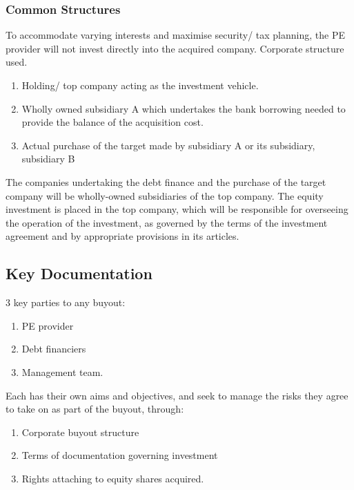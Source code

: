 \documentclass[
]{article}
\providecommand{\tightlist}{%
  \setlength{\itemsep}{0pt}\setlength{\parskip}{0pt}}
\begin{document}
\hypertarget{common-structures}{%
\subsubsection{Common Structures}\label{common-structures}}

To accommodate varying interests and maximise security/ tax planning,
the PE provider will not invest directly into the acquired company.
Corporate structure used.

\begin{enumerate}
\def\labelenumi{\arabic{enumi}.}
\tightlist
\item
  Holding/ top company acting as the investment vehicle.
\item
  Wholly owned subsidiary A which undertakes the bank borrowing needed
  to provide the balance of the acquisition cost.
\item
  Actual purchase of the target made by subsidiary A or its subsidiary,
  subsidiary B
\end{enumerate}

The companies undertaking the debt finance and the purchase of the
target company will be wholly-owned subsidiaries of the top company. The
equity investment is placed in the top company, which will be
responsible for overseeing the operation of the investment, as governed
by the terms of the investment agreement and by appropriate provisions
in its articles.

\hypertarget{key-documentation}{%
\subsection{Key Documentation}\label{key-documentation}}

3 key parties to any buyout:

\begin{enumerate}
\def\labelenumi{\arabic{enumi}.}
\tightlist
\item
  PE provider
\item
  Debt financiers
\item
  Management team.
\end{enumerate}

Each has their own aims and objectives, and seek to manage the risks
they agree to take on as part of the buyout, through:

\begin{enumerate}
\def\labelenumi{\arabic{enumi}.}
\tightlist
\item
  Corporate buyout structure
\item
  Terms of documentation governing investment
\item
  Rights attaching to equity shares acquired.
\end{enumerate}
\end{document}
